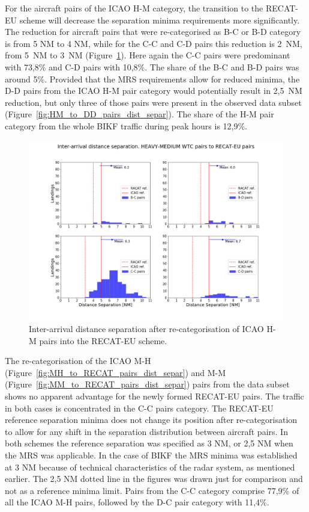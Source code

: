 For the aircraft pairs of the ICAO H-M category, the transition to the RECAT-EU scheme will decrease the separation minima requirements more significantly. The reduction for aircraft pairs that were re-categorised as B-C or B-D category is from 5 NM to 4 NM, while for the C-C and C-D pairs this reduction is 2~NM, from 5~NM to 3~NM (Figure~\ref{fig:HM_to_RECAT_pairs_dist_separ}). Here again the C-C pairs were predominant with 73,8\% and C-D pairs with 10,8\%. The share of the B-C and B-D pairs was around 5\%. Provided that the MRS requirements allow for reduced minima, the D-D pairs from the ICAO H-M pair category would potentially result in 2,5~NM reduction, but only three of those pairs were present in the observed data subset (Figure~\ref{fig:HM_to_DD_pairs_dist_separ}). The share of the H-M pair category from the whole BIKF traffic during peak hours is 12,9\%.

\begin{figure}[h]
    \centering
    \includegraphics[width=1\textwidth]{graphics/fig_HM_to_RECAT_pairs_dist_separ.png}
    \caption[Inter-arrival distance separation of ICAO H-M pairs into the RECAT-EU scheme]{Inter-arrival distance separation after re-categorisation of ICAO H-M pairs into the RECAT-EU scheme.}
    \label{fig:HM_to_RECAT_pairs_dist_separ}
\end{figure}

The re-categorisation of  the ICAO M-H (Figure~\ref{fig:MH_to_RECAT_pairs_dist_separ}) and M-M (Figure~\ref{fig:MM_to_RECAT_pairs_dist_separ}) pairs from the data subset shows no apparent advantage for the newly formed RECAT-EU pairs. The traffic in both cases is concentrated in the C-C pairs category. The RECAT-EU reference separation minima does not change its position after re-categorisation to allow for any shift in the separation distribution between aircraft pairs. In both schemes the reference separation was specified as 3 NM, or 2,5 NM when the MRS was applicable. In the case of BIKF the MRS minima was established at 3 NM because of technical characteristics of the radar system, as mentioned earlier. The 2,5 NM dotted line in the figures was drawn just for comparison and not as a reference minima limit.  Pairs from the C-C category comprise 77,9\% of all the ICAO M-H pairs, followed by the D-C pair category with 11,4\%.

